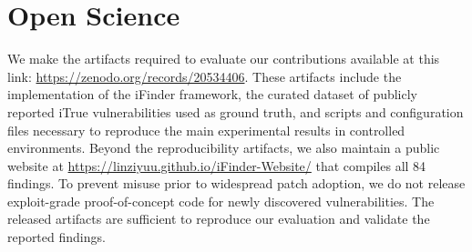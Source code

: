 
\section*{Open Science}
We make the artifacts required to evaluate our contributions available at this link: \url{https://zenodo.org/records/20534406}.
These artifacts include the implementation of the iFinder framework, the curated dataset of publicly reported iTrue vulnerabilities used as ground truth, and scripts and configuration files necessary to reproduce the main experimental results in controlled environments. Beyond the reproducibility artifacts, we also maintain a public website at \url{https://linziyuu.github.io/iFinder-Website/} that compiles all 84 findings.
To prevent misuse prior to widespread patch adoption, we do not release exploit-grade proof-of-concept code for newly discovered vulnerabilities. The released artifacts are sufficient to reproduce our evaluation and validate the reported findings. 
